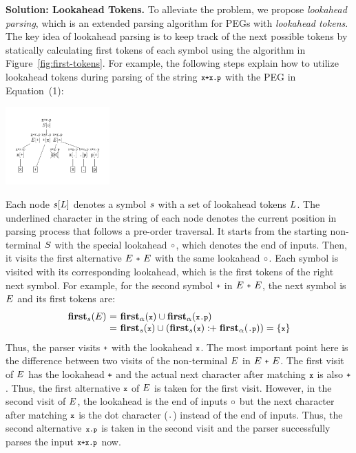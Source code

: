 \textbf{Solution: Lookahead Tokens.}
To alleviate the problem, we propose \textit{lookahead parsing}, which is an
extended parsing algorithm for PEGs with \textit{lookahead tokens}.  The key
idea of lookahead parsing is to keep track of the next possible tokens by
statically calculating first tokens of each symbol using the algorithm in
Figure~\ref{fig:first-tokens}.  For example, the following steps explain how to
utilize lookahead tokens during parsing of the string \( \texttt{\footnotesize x+x.p} \) with
the PEG in Equation~(1): %
\begin{center}
  \includegraphics[width=0.3\textwidth]{img/laparser.pdf}
\end{center}
Each node \( s[L] \) denotes a symbol \( s \) with a set of lookahead
tokens \( L \).  The underlined character in the string of each node denotes
the current position in parsing process that follows a pre-order traversal.  It
starts from the starting non-terminal \( S \) with the special lookahead \(
\circ \), which denotes the end of inputs.  Then, it visits the first
alternative \( E~\texttt{\footnotesize+}~E \) with the same lookahead \( \circ \).
Each symbol is visited with its corresponding lookahead, which is the first
tokens of the right next symbol.  For example, for the second symbol \( \texttt{\footnotesize+} \)
in \( E~\texttt{\footnotesize+}~E \), the next symbol is \( E \) and its first
tokens are:
\[
  \begin{array}{r@{~}c@{~}l}
    \symbfirst{\NT{E}} &=& \rhsfirst{\T{x}} \cup \rhsfirst{\T{x.p}}\\
                       &=& \symbfirst{\T{x}} \cup (\symbfirst{\T{x}} \firstplus
    \rhsfirst{\T{.p}}) = \{ \T{x} \}\\
  \end{array}
\]
Thus, the parser visits \( \texttt{\footnotesize+} \) with the lookahead \( \texttt{\footnotesize x} \).
The most important point here is the difference between two visits of the
non-terminal \( E \) in \( E~\texttt{\footnotesize+}~E \).  The first visit of \(
E \) has the lookahead \( \texttt{\footnotesize+} \) and the actual next character after
matching \( \texttt{\footnotesize x} \) is also \( \texttt{\footnotesize+} \). Thus, the first alternative \( \texttt{\footnotesize x}
\) of \( E \) is taken for the first visit.  However, in the second visit
of \( E \), the lookahead is the end of inputs \( \circ \) but the
next character after matching \( \texttt{\footnotesize x} \) is the dot character (\( \texttt{\footnotesize.} \))
instead of the end of inputs.  Thus, the second alternative \( \texttt{\footnotesize x.p} \) is
taken in the second visit and the parser successfully parses the input \(
\texttt{\footnotesize x+x.p} \) now.

